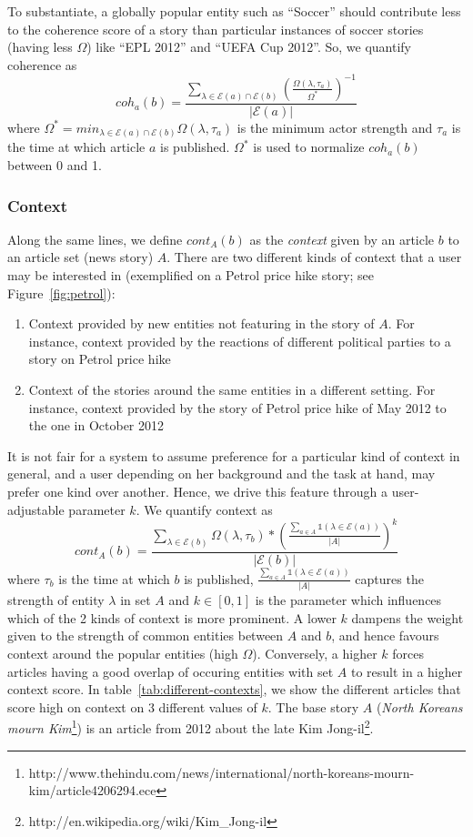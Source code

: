 To substantiate, a globally popular entity such as ``Soccer'' should contribute less to the coherence score
of a story than particular instances of soccer stories (having less $\Omega$) like ``EPL 2012'' and ``UEFA Cup 2012''. So, we quantify coherence as
\begin{equation}
coh_{a}(b) = \frac{\sum_{\lambda \in \mathcal{E}(a) \cap \mathcal{E}(b)}{(\frac{\Omega(\lambda, \tau_a)}{\Omega^{*}})^{-1}}}{|\mathcal{E}(a)|}
\end{equation}
where $\Omega^{*}=min_{\lambda \in \mathcal{E}(a) \cap \mathcal{E}(b)}{\Omega(\lambda, \tau_a)}$ is the minimum actor strength and $\tau_a$ is the time at which article $a$ is published. 
$\Omega^{*}$ is used to normalize $coh_a(b)$ between 0 and 1.

\subsubsection*{Context}
Along the same lines, we define $cont_{A}(b)$ as the \emph{context} given by an article $b$ to an article set (news story) $A$. There are two different kinds of context that a user may be interested in (exemplified on a Petrol price hike story; see Figure~\ref{fig:petrol}):
\begin{enumerate}
\item Context provided by new entities not featuring in the story of $A$. For instance, context provided by the reactions of different political parties to a story on Petrol price hike
\item Context of the stories around the same entities in a different setting. For instance, context provided by the story of Petrol price hike of May 2012 to the one in October 2012
\end{enumerate}
It is not fair for a system to assume preference for a particular kind of context in general, and a user depending on her background and the task at hand, may prefer one kind over another. Hence, we drive this feature through a user-adjustable parameter $k$. 
We quantify context as
\begin{equation}
cont_{A}(b) = \frac{\sum_{\lambda \in \mathcal{E}(b)}{\Omega(\lambda, \tau_b)*(\frac{\sum_{a \in A}\mathbb{1}(\lambda \in \mathcal{E}(a))}{|A|})^{k}}}{|\mathcal{E}(b)|}
\end{equation}
where $\tau_b$ is the time at which $b$ is published, $\frac{\sum_{a \in A}\mathbb{1}(\lambda \in \mathcal{E}(a))}{|A|}$ captures the strength of entity $\lambda$ in set $A$ and $k \in [0, 1]$ is the parameter which influences which of the 2 kinds of context is more prominent. A lower $k$ dampens the weight given to the strength of common entities between $A$ and $b$, and hence favours context 
around the popular entities (high $\Omega$). Conversely, a higher $k$ forces articles having a good overlap of occuring entities with set $A$ to result in a higher context score.
In table~\ref{tab:different-contexts}, we show the different articles that score high on context on 3 different values of $k$. The base story $A$ ({\em North Koreans mourn Kim}\footnote{http://www.thehindu.com/news/international/north-koreans-mourn-kim/article4206294.ece}) is an article from 2012 about the late Kim Jong-il\footnote{http://en.wikipedia.org/wiki/Kim\_Jong-il}. 

